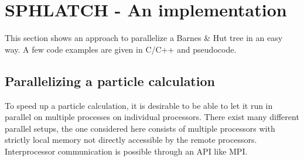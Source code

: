 
\section{SPHLATCH - An implementation}

This section shows an approach to parallelize a Barnes \& Hut tree in an easy way. A few code examples are given in C/C++ and pseudocode.

\subsection{Parallelizing a particle calculation}
To speed up a particle calculation, it is desirable to be able to let it run in parallel on multiple processes on individual processors. There exist many different parallel setups, the one considered here consists of multiple processors with strictly local memory not directly accessible by the remote processors. Interprocessor communication is possible through an API like MPI.\\


